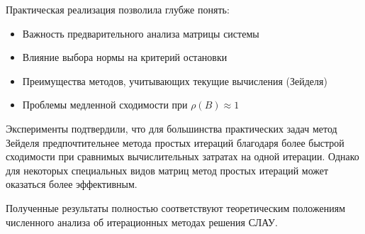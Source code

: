 Практическая реализация позволила глубже понять:
\begin{itemize}
\item Важность предварительного анализа матрицы системы
\item Влияние выбора нормы на критерий остановки
\item Преимущества методов, учитывающих текущие вычисления (Зейделя)
\item Проблемы медленной сходимости при $\rho(B) \approx 1$
\end{itemize}

Эксперименты подтвердили, что для большинства практических задач метод Зейделя предпочтительнее метода простых итераций благодаря более быстрой сходимости при сравнимых вычислительных затратах на одной итерации. Однако для некоторых специальных видов матриц метод простых итераций может оказаться более эффективным.

Полученные результаты полностью соответствуют теоретическим положениям численного анализа об итерационных методах решения СЛАУ.

\pagebreak
